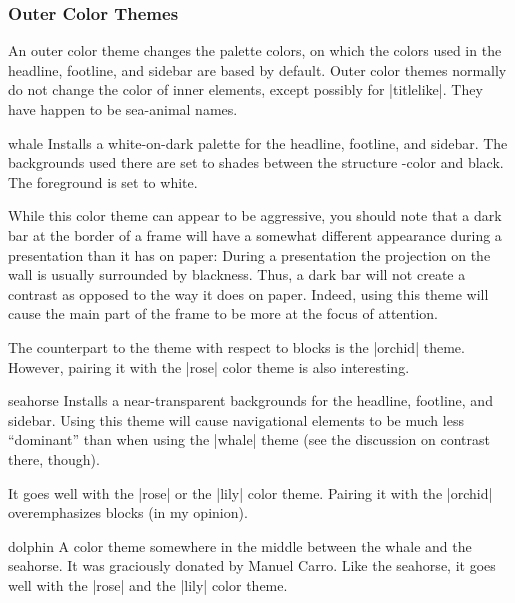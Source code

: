 \subsubsection{Outer Color Themes}

An outer color theme changes the palette colors, on which the colors
used in the headline, footline, and sidebar
are based by default. Outer color themes normally do not change the
color of inner elements, except possibly for |titlelike|. They have
happen to be sea-animal names.

\begin{colorthemeexample}{whale}
  Installs a white-on-dark palette for the headline, footline, and
  sidebar. The backgrounds used there are set to shades between the
  structure \beamer-color and black. The foreground is set to
  white.

  While this color theme can appear to be aggressive, you should note
  that a dark bar at the border of a frame will have a somewhat
  different appearance during a presentation than it has on paper:
  During a presentation the projection on the
  wall is usually surrounded by blackness. Thus, a dark bar will
  not create a contrast as opposed to the way it does on
  paper. Indeed, using this theme will cause the main part of the
  frame to be more at the focus of attention.

  The counterpart to the theme with respect to blocks is the |orchid|
  theme. However, pairing it with the |rose| color theme is also
  interesting.
\end{colorthemeexample}

\begin{colorthemeexample}{seahorse}
  Installs a near-transparent backgrounds for the headline, footline,
  and sidebar. Using this theme will cause navigational elements to be
  much less ``dominant'' than when using the |whale| theme (see the
  discussion on contrast there, though).

  It goes well with the |rose| or the |lily| color theme. Pairing it
  with the |orchid| overemphasizes blocks (in my opinion).
\end{colorthemeexample}


\begin{colorthemeexample}{dolphin}
  A color theme somewhere in the middle between the whale and the
  seahorse. It was graciously donated by Manuel Carro. Like the
  seahorse, it goes well with the |rose| and the |lily| color theme.
\end{colorthemeexample}




